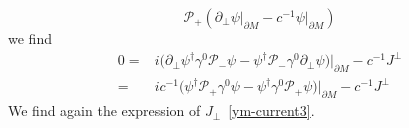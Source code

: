 \begin{remark}
\begin{equation*}
\mathcal{P}_+(\partial_\bot\psi\vert_{\partial M} - c^{-1} \psi\vert_{\partial M})
\end{equation*}
we find
\begin{equation*}
\begin{split}
0 = &
i \big( \partial_\bot\psi^\dagger\gamma^0\mathcal{P}_-\psi 
- \psi^\dagger\mathcal{P}_-\gamma^0\partial_\bot\psi \big)\vert_{\partial M}  
-c^{-1}J^\bot \\
= &
i c^{-1}\big( \psi^\dagger\mathcal{P}_+\gamma^0\psi 
- \psi^\dagger\gamma^0\mathcal{P}_+\psi \big)\vert_{\partial M} 
-c^{-1}J^\bot
\end{split}
\end{equation*}
We find again the expression of $J_\bot$~\cref{ym-current3}.
\end{remark}











